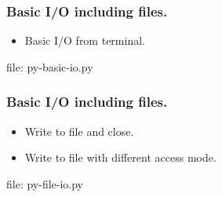 
\begin{frame}[fragile]
\frametitle{Basic I/O including files.}
\newcommand{\newfilename}{py-basic-io.py}
\begin{itemize}
\item Basic I/O from terminal.

\end{itemize}
file: \newfilename
\end{frame}

\begin{frame}[fragile]
\frametitle{Basic I/O including files.}
\newcommand{\newfilename}{py-file-io.py}
\begin{itemize}
\item Write to file and close.


\item Write to file with different access mode.

\end{itemize}
file: \newfilename
\end{frame}
